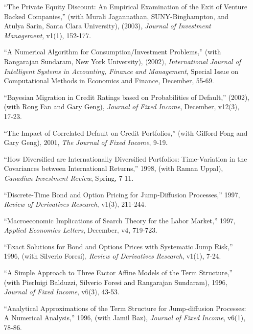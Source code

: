 \documentclass{article}
\begin{document}
\begin{etaremune}
\item ``The Private Equity Discount: An Empirical Examination of the
Exit of Venture Backed Companies,'' (with Murali Jagannathan,
SUNY-Binghampton, and Atulya Sarin, Santa Clara University), (2003),
{\it Journal of Investment Management}, v1(1), 152-177.


\item ``A Numerical Algorithm for Consumption/Investment Problems,''
(with Rangarajan Sundaram, New York University), (2002), 
{\it International Journal of Intelligent Systems
in Accounting, Finance and Management}, Special Issue on
Computational Methods in Economics and Finance, December, 55-69.


\item ``Bayesian Migration in Credit Ratings based on Probabilities
of Default,''  (2002), (with Rong Fan and Gary Geng), {\it
Journal of Fixed Income}, December, v12(3), 17-23.

\item ``The Impact of Correlated Default on Credit Portfolios,''
(with Gifford Fong and Gary Geng), 2001, {\it The Journal 
of Fixed Income}, 9-19.

\item
``How Diversified are Internationally Diversified Portfolios:
Time-Variation in the Covariances between International Returns,''
1998, (with Raman Uppal), {\it Canadian Investment Review}, Spring, 7-11.

\item
``Discrete-Time Bond and Option Pricing for Jump-Diffusion
Processes,'' 1997, {\it Review of Derivatives Research}, v1(3), 211-244.  

\item
``Macroeconomic Implications of Search Theory for the Labor Market,''
1997, {\it Applied Economics Letters}, December, v4, 719-723.
 

\item
``Exact Solutions for Bond and Options Prices
with Systematic Jump Risk,'' 1996, (with Silverio Foresi),
{\it Review of Derivatives Research}, v1(1), 7-24.  

\item
``A Simple Approach to Three Factor Affine Models of the
Term Structure,'' (with Pierluigi Balduzzi, Silverio Foresi and Rangarajan
Sundaram), 1996, {\it Journal of Fixed Income}, v6(3), 43-53.

\item
``Analytical Approximations of  the Term Structure
for Jump-diffusion Processes: A Numerical Analysis,'' 1996, 
(with Jamil Baz), {\it Journal of Fixed Income}, v6(1), 78-86.  


\end{etaremune}
\end{document}

